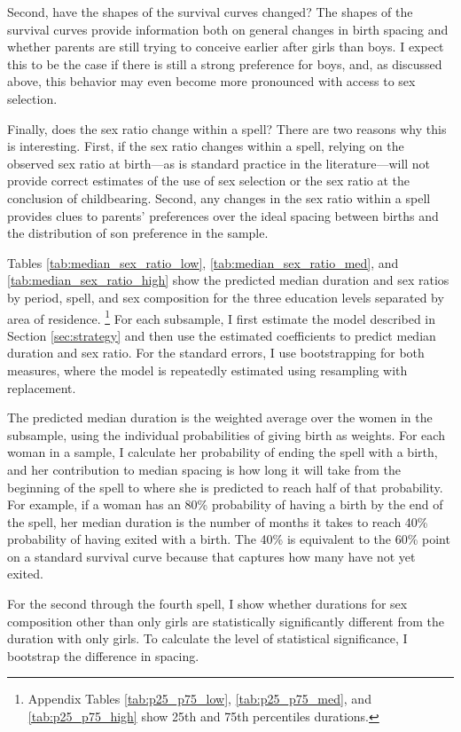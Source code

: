 \documentclass[12pt,letterpaper]{article}
\begin{document}
Second, have the shapes of the survival curves changed?
The shapes of the survival curves provide information both on general
changes in birth spacing and whether parents are
still trying to conceive earlier after girls than boys.
I expect this to be the case if there is still a strong preference for
boys, and, as discussed above, this behavior may even become more pronounced
with access to sex selection.


Finally, does the sex ratio change within a spell?
There are two reasons why this is interesting.
First, if the sex ratio changes within a spell, relying on the observed sex
ratio at birth---as is standard practice in the literature---will not provide
correct estimates of the use of sex selection or the sex ratio at
the conclusion of childbearing.
Second, any changes in the sex ratio within a spell provides clues
to parents' preferences over the ideal spacing between births and the
distribution of son preference in the sample.


Tables \ref{tab:median_sex_ratio_low}, \ref{tab:median_sex_ratio_med}, and
\ref{tab:median_sex_ratio_high}
show the predicted median duration and sex ratios by period, spell, and sex 
composition for the three education levels separated by area of residence.%
\footnote{
Appendix Tables \ref{tab:p25_p75_low}, \ref{tab:p25_p75_med}, and 
\ref{tab:p25_p75_high} show 25th and 75th percentiles durations.
} 
For each subsample, I first estimate the model described in Section 
\ref{sec:strategy} and then use the estimated coefficients to predict 
median duration and sex ratio.
For the standard errors, I use bootstrapping for both measures,
where the model is repeatedly estimated using resampling with replacement.


The predicted median duration is the weighted average over the women in the 
subsample, using the individual probabilities of giving birth as weights.
For each woman in a sample, I calculate her probability of ending the spell 
with a birth, and her contribution to median spacing is how long it will take
from the beginning of the spell to where she is predicted to reach half of that probability.
For example, if a woman has an 80\% probability of having a birth by the end of 
the spell, her median duration is the number of months it takes to reach
40\% probability of having exited with a birth.
The 40\% is equivalent to the 60\% point on a standard survival curve because that 
captures how many have not yet exited.

For the second through the fourth spell, I show whether durations for sex 
composition other than only girls are statistically significantly different 
from the duration with only girls.
To calculate the level of statistical significance, I bootstrap the
difference in spacing.
 
\end{document}
